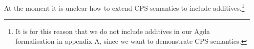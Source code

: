 At the moment it is unclear how to extend 
CPS-semantics to include additives.\footnote{%
  It is for this reason that we do not include additives in our
  Agda formalisation in appendix A, since we want to demonstrate
  CPS-semantics.
}


%
